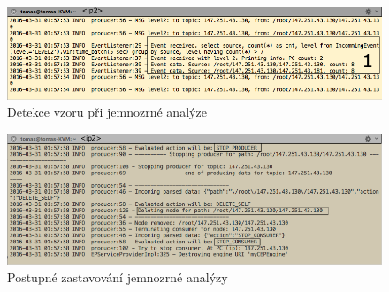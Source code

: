 \documentclass[
  digital, %
  table,   %
  nolof,     %
  nolot,     %
  oneside, %
  nocover,
  monochrome,
  12pt
]{fithesis3}
\begin{document}
\begin{figure}[H]
	\centering
    \includegraphics[width=.9\linewidth, height=.14\textheight]{images/match-pattern-screen.png}
    \caption{Detekce vzoru při jemnozrné analýze}
    \label{fig:match-pattern-screen}
\end{figure}

\begin{figure}[H]
	\centering
    \includegraphics[width=.8\linewidth, height=.14\textheight]{images/clean-up-screen.png}
    \caption{Postupné zastavování jemnozrné analýzy}
    \label{fig:clean-up-screen}
\end{figure}
\end{document}
